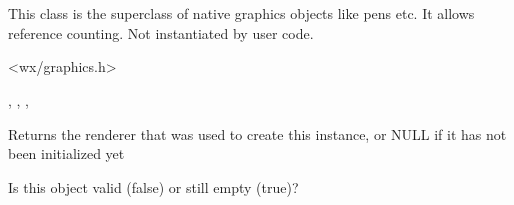 
\section{}\label{wxgraphicsobject}

This class is the superclass of native graphics objects like pens etc. It allows reference counting. Not instantiated by user code.




<wx/graphics.h>


, , , 


\label{wxgraphicsobjectgetrenderer}


Returns the renderer that was used to create this instance, or NULL if it has not been initialized yet

\label{wxgraphicsobjectisnull}


Is this object valid (false) or still empty (true)?

